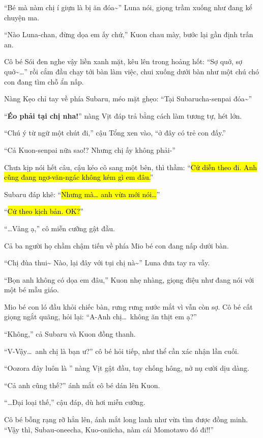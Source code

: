 \documentclass[../main.tex]{subfiles}
\begin{document}
``Bé mà nàm chị í giựn là bị ăn đóa\~{}'' Luna nói, giọng trầm xuống như đang kể chuyện ma.

``Nào Luna-chan, đừng dọa em ấy chứ,'' Kuon chau mày, bước lại gần định trấn an.

Cô bé Sói đen nghe vậy liền xanh mặt, kêu lên trong hoảng hốt: ``Sợ quớ, sợ quớ\~{}\dots'' rồi cắm đầu chạy tới bàn làm việc, chui xuống dưới bàn như một chú chó con đang tìm chỗ ẩn nấp.

Nàng Kẹo chỉ tay về phía Subaru, méo mặt ghẹo: ``Tại Subarucha-senpai đóa\~{}''

``\textbf{Éo phải tại chị nha!}''  nàng Vịt đáp trả bằng cách làm tương tự, hét lớn.

``Chú ý từ ngữ một chút đi,'' cậu Tổng xen vào, ``ở đây có trẻ con đấy.''

``Cả Kuon-senpai nữa sao!? Nhưng chị ấy không phải-''

Chưa kịp nói hết câu, cậu kéo cô sang một bên, thì thầm: ``\hl{Cứ diễn theo đi. Anh cũng đang ngơ-văn-ngác không kém gì em đâu.}''

Subaru đáp khẽ: ``\hl{Nhưng mà\dots{} anh vừa mới nói\dots}''

``\hl{Cứ theo kịch bản. OK?}''

``\dots Vâng ạ,'' cô miễn cưỡng gật đầu.

Cả ba người họ chầm chậm tiến về phía Mio bé con đang nấp dưới bàn.

``Chị đùa thui\~{} Nào, lại đây với tụi chị nà\~{}'' Luna đưa tay ra vẫy.

``Bọn anh không có dọa em đâu,'' Kuon nhẹ nhàng, giọng điệu như đang nói với một bé mẫu giáo.

Mio bé con ló đầu khỏi chiếc bàn, rưng rưng nước mắt vì vẫn còn sợ. Cô bé cất giọng ngắt quãng, hỏi lại: ``A-Anh chị\dots\ không ăn thịt em ạ?''

``Không,'' cả Subaru và Kuon đồng thanh.

``V-Vậy\dots\ anh chị là bạn ư?'' cô bé hỏi tiếp, như thể cần xác nhận lần cuối.

``Oozora đây luôn là '' nàng Vịt gật đầu, tay chống hông, nở nụ cười dịu dàng.

``Cả anh cũng thế?''  ánh mắt cô bé dán lên Kuon.

``\dots Đại loại thế,'' cậu đáp, dù hơi miễn cưỡng.

Cô bé bỗng rạng rỡ hẳn lên, ánh mắt long lanh như vừa tìm được đồng minh. ``Vậy thì, Subau-oneecha, Kuo-oniicha, nàm cái Momotawo đó đi!!''
\end{document}
